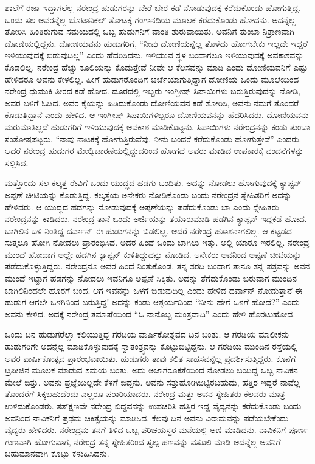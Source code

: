ಶಾಲೆಗೆ ರಜಾ ಇದ್ದಾಗಲೆಲ್ಲ ನರೇಂದ್ರ ಹುಡುಗರನ್ನು ಬೇರೆ ಬೇರೆ ಕಡೆ ನೋಡುವುದಕ್ಕೆ ಕರೆದುಕೊಂಡು ಹೋಗುತ್ತಿದ್ದ. ಒಂದು ಸಲ ಅವರನ್ನೆಲ್ಲ ಬೊಟಾನಿಕಲ್ ತೋಟಕ್ಕೆ ಗಂಗಾನದಿಯ ಮೂಲಕ ಕರೆದುಕೊಂಡು ಹೋದನು. ಅದನ್ನೆಲ್ಲ ತೋರಿಸಿ ಹಿಂತಿರುಗುವ ಸಮಯದಲ್ಲಿ ಒಬ್ಬ ಹುಡುಗನಿಗೆ ವಾಂತಿ ಶುರುವಾಯಿತು. ಅವನಿಗೆ ತುಂಬಾ ನಿತ್ರಾಣವಾಗಿ ದೋಣಿಯಲ್ಲಿದ್ದನು. ದೋಣಿಯವನು ಹುಡುಗರಿಗೆ, “ನೀವು ದೋಣಿಯನ್ನೆಲ್ಲ ತೊಳೆದು ಹೋಗಬೇಕು ಇಲ್ಲದೇ ಇದ್ದರೆ ಇಳಿಯುವುದಕ್ಕೆ ಬಿಡುವುದಿಲ್ಲ” ಎಂದು ಹೆದರಿಸಿದನು. ಇಳಿಯುವ ಸ್ಥಳ ಬಂದಾಗಲೂ ಇಳಿಯುವುದಕ್ಕೆ ಅವಕಾಶವನ್ನು ಕೊಡಲಿಲ್ಲ. ನರೇಂದ್ರ ಹೆಚ್ಚು ಕೂಲಿಯನ್ನು ಕೊಡುತ್ತೇವೆ ನೀವೇ ಆ ಕೆಲಸವನ್ನು ಮಾಡಿ ಎಂದು ದೋಣಿಯವನಿಗೆ ಎಷ್ಟು ಹೇಳಿದರೂ ಅವನು ಕೇಳಲಿಲ್ಲ. ಹೀಗೆ ಹುಡುಗರೊಂದಿಗೆ ಚರ್ಚೆಯಾಗುತ್ತಿದ್ದಾಗ ದೋಣಿಯ ಒಂದು ಮೂಲೆಯಿಂದ ನರೇಂದ್ರ ಧುಮುಕಿ ತೀರದ ಕಡೆ ಹೋದ. ದೂರದಲ್ಲಿ ಇಬ್ಬರು ಇಂಗ್ಲೀಷ್ ಸಿಪಾಯಿಗಳು ಬರುತ್ತಿರುವುದನ್ನು ನೋಡಿ, ಅವರ ಬಳಿಗೆ ಓಡಿದ. ಅವರ ಕೈಯನ್ನು ಹಿಡಿದುಕೊಂಡು ದೋಣಿಯವನ ಕಡೆ ತೋರಿಸಿ, ಅವನು ನಮಗೆ ತೊಂದರೆ ಕೊಡುತ್ತಿದ್ದಾನೆ ಎಂದು ಹೇಳಿದ. ಆ ಇಂಗ್ಲೀಷ್ ಸಿಪಾಯಿಗಳಿಬ್ಬರೂ ದೋಣಿಯವನನ್ನು ಹೆದರಿಸಿದರು. ದೋಣಿಯವನು ಮರುಮಾತಿಲ್ಲದೆ ಹುಡುಗರಿಗೆ ಇಳಿಯುವುದಕ್ಕೆ ಅವಕಾಶ ಮಾಡಿಕೊಟ್ಟನು. ಸಿಪಾಯಿಗಳು ನರೇಂದ್ರನನ್ನು ಕಂಡು ತುಂಬಾ ಸಂತೋಷಪಟ್ಟರು. “ನಾವು ನಾಟಕಕ್ಕೆ ಹೋಗುತ್ತಿರುವೆವು. ನೀನು ಬಂದರೆ ಕರೆದುಕೊಂಡು ಹೋಗುತ್ತೇವೆ” ಎಂದರು. ಆದರೆ ನರೇಂದ್ರ ಹುಡುಗರ ಮೇಲ್ವಿಚಾರಣೆಯಲ್ಲಿದ್ದುದರಿಂದ ಹೋಗದೆ ಅವರು ಮಾಡಿದ ಉಪಕಾರಕ್ಕೆ ವಂದನೆಗಳನ್ನು ಸಲ್ಲಿಸಿದ.

ಮತ್ತೊಂದು ಸಲ ಕಲ್ಕತ್ತ ರೇವಿಗೆ ಒಂದು ಯುದ್ಧದ ಹಡಗು ಬಂದಿತು. ಅದನ್ನು ನೋಡಲು ಹೋಗುವುದಕ್ಕೆ ಕ್ಯಾಪ್ಟನ್ ಅಪ್ಪಣೆ ಚೀಟಿಯನ್ನು ಕೊಡುತ್ತಿದ್ದ. ಕಲ್ಕತ್ತೆಯ ಅನೇಕರು ನೋಡಿಕೊಂಡು ಬಂದು ನರೇಂದ್ರನ ಸ್ನೇಹಿತರಿಗೆ ಅದನ್ನು ಹೇಳಿದರು. ಆ ಯುದ್ಧದ ಹಡಗನ್ನು ನೋಡುವುದಕ್ಕೆ ಅಪ್ಪಣೆಯನ್ನು ಪಡೆದುಕೊಂಡು ಬಾ ಎಂದು ಸ್ನೇಹಿತರು ನರೇಂದ್ರನನ್ನು ಕಾಡಿದರು. ನರೇಂದ್ರ ತಾನೆ ಒಂದು ಅರ್ಜಿಯನ್ನು ತಯಾರುಮಾಡಿ ಹಡಗಿನ ಕ್ಯಾಪ್ಟನ್ ಇದ್ದಕಡೆ ಹೋದ. ಬಾಗಿಲಿನ ಬಳಿ ನಿಂತಿದ್ದ ದರ್ವಾನ್ ಈ ಹುಡುಗನನ್ನು ಬಿಡಲಿಲ್ಲ. ಆದರೆ ನರೇಂದ್ರ ಹತಾಶನಾಗಲಿಲ್ಲ. ಆ ಕಟ್ಟಡದ ಸುತ್ತಲೂ ಹೋಗಿ ನೋಡಲು ಪ್ರಾರಂಭಿಸಿದ. ಅದರ ಹಿಂದೆ ಒಂದು ಬಾಗಿಲು ಇತ್ತು. ಅಲ್ಲಿ ಯಾರೂ ಇರಲಿಲ್ಲ. ನರೇಂದ್ರ ಮುಂದೆ ಹೋದಾಗ ಅಲ್ಲೇ ಹಡಗಿನ ಕ್ಯಾಪ್ಟನ್ ಕುಳಿತಿದ್ದುದನ್ನು ನೋಡಿದ. ಅನೇಕರು ಅವನಿಂದ ಅಪ್ಪಣೆ ಚೀಟಿಯನ್ನು ಪಡೆದುಕೊಳ್ಳುತ್ತಿದ್ದರು. ನರೇಂದ್ರನೂ ಅವರ ಹಿಂದೆ ನಿಂತುಕೊಂಡ. ತನ್ನ ಸರದಿ ಬಂದಾಗ ತಾನೂ ತನ್ನ ಪತ್ರವನ್ನು ಅವನ ಮುಂದೆ ಇಟ್ಟಾಗ ಹಡಗನ್ನು ನೋಡಲು ಇವನಿಗೂ ಅಪ್ಪಣೆ ಸಿಕ್ಕಿತು. ಅದನ್ನು ತೆಗೆದುಕೊಂಡು ಬರುವಾಗ ಮುಂದಿನ ಬಾಗಿಲಿನಿಂದಲೇ ಹೊರಗೆ ಬಂದ. ಆಗ ಇವನನ್ನು ಒಳಗೆ ಬಿಡುವುದಿಲ್ಲ ಎಂದು ಹೇಳಿದ ದರ್ವಾನ್ ನೋಡುತ್ತಾನೆ ಈ ಹುಡುಗ ಆಗಲೇ ಒಳಗಿನಿಂದ ಬರುತ್ತಿದ್ದ! ಅದನ್ನು ಕಂಡು ಆಶ್ಚರ್ಯದಿಂದ “ನೀನು ಹೇಗೆ ಒಳಗೆ ಹೋದೆ?” ಎಂದು ಅವನು ಕೇಳಿದ. ಅದಕ್ಕೆ ನರೇಂದ್ರ ತಮಾಷೆಯಿಂದ “ಓ ನಾನೊಬ್ಬ ಮಂತ್ರವಾದಿ” ಎಂದು ಹೇಳಿ ಹೊರಟುಹೋದ.

ಒಂದು ದಿನ ಹುಡುಗರೆಲ್ಲಾ ಕಲಿಯುತ್ತಿದ್ದ ಗರಡಿಯ ವಾರ್ಷಿಕೋತ್ಸವದ ದಿನ ಬಂತು. ಆ ಗರಡಿಯ ಮಾಲೀಕನು ಹುಡುಗರಿಗೇ ಅದನ್ನೆಲ್ಲ ಮಾಡಿಕೊಳ್ಳುವುದಕ್ಕೆ ಸ್ವಾತಂತ್ರ್ಯವನ್ನು ಕೊಟ್ಟುಬಿಟ್ಟಿದ್ದನು. ಆ ಗರಡಿಯ ಮುಂದಿನ ರಸ್ತೆಯಲ್ಲಿ ಅವರ ವಾರ್ಷಿಕೋತ್ಸವ ಪ್ರಾರಂಭವಾಯಿತು. ಹುಡುಗರು ತಾವು ಕಲಿತ ಸಾಹಸವನ್ನೆಲ್ಲ ಪ್ರದರ್ಶಿಸುತ್ತಿದ್ದರು. ಕೊನೆಗೆ ಟ್ರಪೀಜಿನ ಮೂಲಕ ಮಾಡುವ ಸಮಯ ಬಂತು. ಅದು ಅಜಾಗರೂಕತೆಯಿಂದ ನೋಡಲು ಬಂದಿದ್ದ ಒಬ್ಬ ನಾವಿಕನ ಮೇಲೆ ಬಿತ್ತು. ಅವನು ಪ್ರಜ್ಞೆಯಿಲ್ಲದೇ ಕೆಳಗೆ ಬಿದ್ದನು. ಅವನು ಸತ್ತುಹೋಗಿಬಿಟ್ಟಿರಬಹುದು, ಹತ್ತಿರ ಇದ್ದರೆ ನಾವೆಲ್ಲ ತೊಂದರೆಗೆ ಸಿಕ್ಕಬಹುದೆಂದು ಎಲ್ಲರೂ ಪರಾರಿಯಾದರು. ನರೇಂದ್ರ ಮತ್ತು ಅವನ ಸ್ನೇಹಿತರು ಕೆಲವರು ಮಾತ್ರ ಉಳಿದುಕೊಂಡರು. ತತ್‍ಕ್ಷಣವೇ ನರೇಂದ್ರ ಬಿದ್ದವನನ್ನು ಉಪಚರಿಸಿ ಹತ್ತಿರ ಇದ್ದ ವೈದ್ಯನನ್ನು ಕರೆದುಕೊಂಡು ಬಂದು ಅವನಿಂದ ನಾವಿಕನಿಗೆ ಪ್ರಥಮ ಚಿಕಿತ್ಸೆಯನ್ನು ಮಾಡಿಸಿದ. ಕೆಲವು ದಿನ ಅವನು ವಿರಾಮವನ್ನು ಪಡೆಯಬೇಕೆಂದು ವೈದ್ಯರು ಹೇಳಿದರು. ನರೇಂದ್ರನು ತನಗೆ ತಿಳಿದ ಒಬ್ಬ ಪರಿಚಯಸ್ಥರ ಮನೆಯಲ್ಲಿ ಅಣಿ ಮಾಡಿದನು. ನಾವಿಕನಿಗೆ ಪೂರ್ಣ ಗುಣವಾಗಿ ಹೋಗುವಾಗ, ನರೇಂದ್ರ ತನ್ನ ಸ್ನೇಹಿತರಿಂದ ಸ್ವಲ್ಪ ಹಣವನ್ನು ವಸೂಲಿ ಮಾಡಿ ಅದನ್ನೆಲ್ಲ ಅವನಿಗೆ ಬಹುಮಾನವಾಗಿ ಕೊಟ್ಟು ಕಳುಹಿಸಿದನು.

